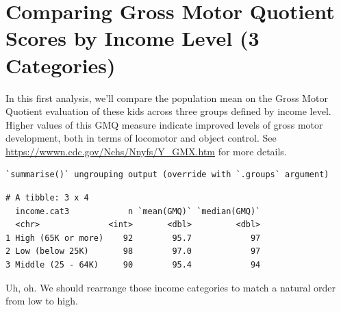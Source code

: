 \documentclass[
]{book}
\newenvironment{Shaded}{\begin{snugshade}}{\end{snugshade}}
\newcommand{\DataTypeTok}[1]{\textcolor[rgb]{0.13,0.29,0.53}{#1}}
\newcommand{\KeywordTok}[1]{\textcolor[rgb]{0.13,0.29,0.53}{\textbf{#1}}}
\newcommand{\NormalTok}[1]{#1}
\newcommand{\OperatorTok}[1]{\textcolor[rgb]{0.81,0.36,0.00}{\textbf{#1}}}
\newcommand{\StringTok}[1]{\textcolor[rgb]{0.31,0.60,0.02}{#1}}
\begin{document}
\hypertarget{comparing-gross-motor-quotient-scores-by-income-level-3-categories}{%
\section{Comparing Gross Motor Quotient Scores by Income Level (3 Categories)}\label{comparing-gross-motor-quotient-scores-by-income-level-3-categories}}

\begin{Shaded}
\end{Shaded}

In this first analysis, we'll compare the population mean on the Gross Motor Quotient evaluation of these kids across three groups defined by income level. Higher values of this GMQ measure indicate improved levels of gross motor development, both in terms of locomotor and object control. See \url{https://wwwn.cdc.gov/Nchs/Nnyfs/Y_GMX.htm} for more details.

\begin{Shaded}
\end{Shaded}

\begin{verbatim}
`summarise()` ungrouping output (override with `.groups` argument)
\end{verbatim}

\begin{verbatim}
# A tibble: 3 x 4
  income.cat3            n `mean(GMQ)` `median(GMQ)`
  <chr>              <int>       <dbl>         <dbl>
1 High (65K or more)    92        95.7            97
2 Low (below 25K)       98        97.0            97
3 Middle (25 - 64K)     90        95.4            94
\end{verbatim}

Uh, oh. We should rearrange those income categories to match a natural order from low to high.
\end{document}
